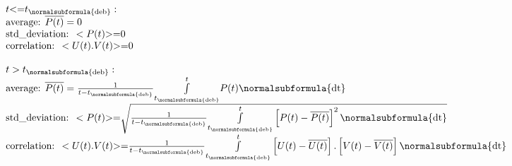 \begin{equation*}
\begin{matrix}t\text{{\textless}=}t_{\normalsubformula{\text{deb}}}:\hfill\null \\\text{average:
}\overline{P(t)}=0\hfill\null \\\text{std\_deviation: }<P(t)\text{{\textgreater}=}0\hfill\null \\\text{correlation:
}<U(t).V(t)\text{{\textgreater}=0}\hfill\null \\\text{ }\hfill\null \\t>t_{\normalsubformula{\text{deb}}}:\hfill\null
\\\text{average: }\overline{P(t)}=\frac 1{t-t_{\normalsubformula{\text{deb}}}}\overset
t{\underset{t_{\normalsubformula{\text{deb}}}}{\int }}P(t)\normalsubformula{\text{dt}}\hfill\null
\\\text{std\_deviation: }<P(t)\text{{\textgreater}=}\sqrt{\frac 1{t-t_{\normalsubformula{\text{deb}}}}\overset
t{\underset{t_{\normalsubformula{\text{deb}}}}{\int
}}\left[P(t)-\overline{P(t)}\right]^2\normalsubformula{\text{dt}}}\hfill\null \\\text{correlation:
}<U(t).V(t)\text{{\textgreater}=}\frac 1{t-t_{\normalsubformula{\text{deb}}}}\overset
t{\underset{t_{\normalsubformula{\text{deb}}}}{\int
}}\left[U(t)-\overline{U(t)}\right].\left[V(t)-\overline{V(t)}\right]\normalsubformula{\text{dt}}\hfill\null
\end{matrix}\hfill 
\end{equation*}
